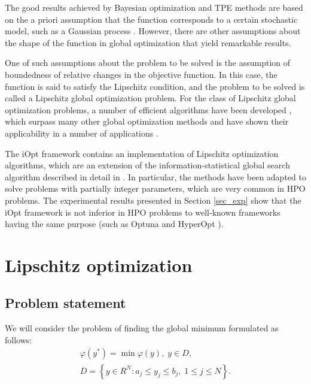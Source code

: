 \documentclass[preprint,12pt]{elsarticle}
\begin{document}
The good results achieved by Bayesian optimization \cite{Joy2020} and TPE \cite{Watanabe2022a,Watanabe2022b} methods are based on the a priori assumption that the function corresponds to a certain stochastic model, such as a Gaussian process \cite{Rasmussen2005}. However, there are other assumptions about the shape of the function in global optimization that yield remarkable results. 

One of such assumptions about the problem to be solved is the assumption of boundedness of relative changes in the objective function. In this case, the function is said to satisfy the Lipschitz condition, and the problem to be solved is called a Lipschitz global optimization problem. For the class of Lipschitz global optimization problems, a number of efficient algorithms have been developed \cite{Jones2021,Paulavicius2020,Strongin2020,Sergeyev2017,PaulaviciusZilinskas2014}, which surpass many other global optimization methods \cite{Sergeyev2018} and have shown their applicability in a number of applications \cite{Kvasov2008,CANDELIERI2019,Gubaydullin2021}.

The iOpt framework contains an implementation of Lipschitz optimization algorithms, which are an extension of the information-statistical global search algorithm described in detail in \cite{Strongin2000,Sergeyev2013}. In particular, the methods have been adapted to solve problems with partially integer parameters, which are very common in HPO problems. The experimental results presented in Section \ref{sec_exp} show that the iOpt framework is not inferior in HPO problems to well-known frameworks having the same purpose (such as Optuna \cite{optuna} and HyperOpt \cite{hyperopt}). 

\section{Lipschitz optimization} 
\label{sec_lip}

\subsection{Problem statement} 

We will consider the problem of finding the global minimum formulated as follows:
\begin{gather}
	\varphi(y^*) = \min \varphi(y), \; y \in D, \label{f_func} \\
	D = \left\{y \in R^N : a_j \leq y_j \leq b_j , \; 1 \leq j \leq N \right\}. \label{f_D}
\end{gather}
\end{document}
